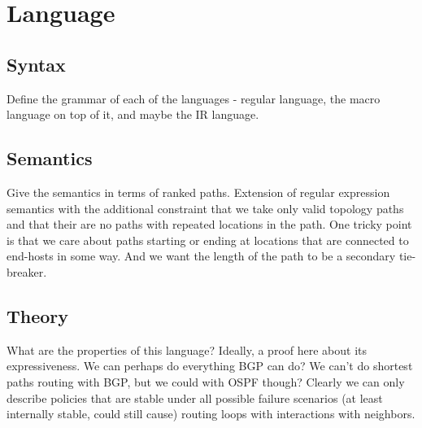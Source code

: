 \section{Language}
\label{sec:language}

\subsection{Syntax}
Define the grammar of each of the languages - regular language, the macro language on top of it, and maybe the IR language.

\subsection{Semantics}
Give the semantics in terms of ranked paths.
Extension of regular expression semantics with the
additional constraint that we take only valid topology paths and that their are no paths with
repeated locations in the path. One tricky point is that we care about paths starting or ending at locations that are
connected to end-hosts in some way. And we want the length of the path to be a secondary tie-breaker.

\subsection{Theory}
What are the properties of this language? Ideally, a proof here about its expressiveness. We can perhaps do everything
BGP can do? We can't do shortest paths routing with BGP, but we could with OSPF though? Clearly we can only describe
policies that are stable under all possible failure scenarios (at least internally stable, could still cause) routing
loops with interactions with neighbors.


